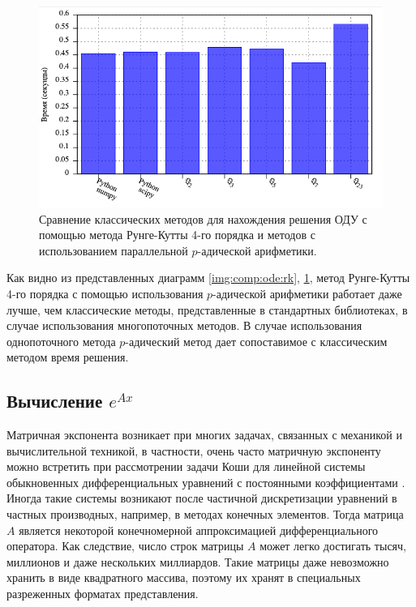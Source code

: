 \documentclass[master, och, times, pract]{sty/SCWorks}
\theoremstyle{plain}
\theoremstyle{definition}
\numberwithin{equation}{section}
\begin{document}
\begin{figure}[H]
\centerline{\includegraphics[width=0.85\linewidth]{../gnuplot/multi/rk/multi.png}}
\caption{Сравнение классических методов для нахождения решения ОДУ с помощью метода Рунге-Кутты 4-го порядка и методов с использованием параллельной $p$-адической арифметики.}
\label{img:comp:ode:rk:multi}
\end{figure}

Как видно из представленных диаграмм \ref{img:comp:ode:rk}, \ref{img:comp:ode:rk:multi}, метод Рунге-Кутты 4-го порядка с помощью использования $p$-адической арифметики работает даже лучше, чем классические методы, представленные в стандартных библиотеках, в случае использования многопоточных методов. В случае использования однопоточного метода $p$-адический метод дает сопоставимое с классическим методом время решения.

\subsection{Вычисление $e^{Ax}$}

Матричная экспонента возникает при многих задачах, связанных с механикой и вычислительной техникой, в частности, очень часто матричную экспоненту можно встретить при рассмотрении задачи Коши для линейной системы обыкновенных дифференциальных уравнений с постоянными коэффициентами \cite{bib:ode:2}. Иногда такие системы возникают после частичной дискретизации уравнений в частных производных, например, в методах конечных элементов. Тогда матрица $A$ является некоторой конечномерной аппроксимацией дифференциального оператора. Как следствие, число строк матрицы $A$ может легко достигать тысяч, миллионов и даже нескольких миллиардов\cite{bib:ode:3}. Такие матрицы даже невозможно хранить в виде квадратного массива, поэтому их хранят в специальных разреженных форматах представления.
\end{document}
